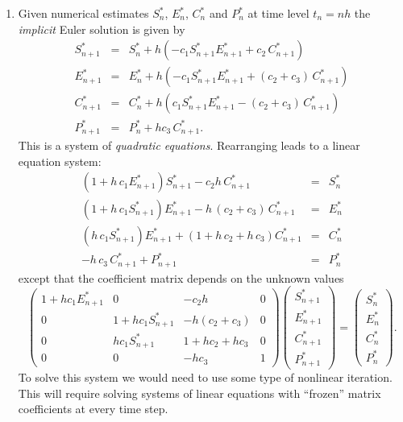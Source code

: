 \documentclass[11pt,a4paper]{article}
\begin{document}
\begin{enumerate}
{\begin{enumerate}
\item 
	Given  numerical estimates $S^*_{n}$,   $E^*_{n}$,  $C^*_{n}$ and  $P^*_{n}$
          at time level $t_n=nh$  the {\it implicit} Euler solution is given by 
	\begin{eqnarray*}
       S^*_{n+1}   &= &  S^*_{n} +h( -c_1 S^*_{n+1} E^*_{n+1}  +c_2\,C^*_{n+1})\\
       E^*_{n+1}  &= &   E^*_{n}  +h(  -c_1 S^*_{n+1} E^*_{n+1}  + (c_2 +c_3) \,C^*_{n+1})\\
      C^*_{n+1}  &= &   C^*_{n} +h( c_1 S^*_{n+1} E^*_{n+1}  - (c_2 +c_3) \,C^*_{n+1})\\
      P^*_{n+1}   &= &   P^*_{n}+h  c_3 \,C^*_{n+1}.
\end{eqnarray*}
This is a system of {\it quadratic equations}. 
Rearranging leads to a linear equation system:	
\begin{eqnarray*}
      (1+ h\, c_1 E^*_{n+1} )S^*_{n+1}   - c_2 h \,C^*_{n+1} &= &  S^*_{n} \\
     (1+ h\, c_1 S^*_{n+1} )  E^*_{n+1}  - h\, (c_2 +c_3) \,C^*_{n+1} &= &   E^*_{n}  \\
     (h \, c_1 S^*_{n+1}) E^*_{n+1} +  (1  +h\,  c_2 + h\,c_3) C^*_{n+1}  &= &   C^*_{n}   \\
      -h\,  c_3 \,C^*_{n+1} +   P^*_{n+1}  &= &   P^*_{n} \end{eqnarray*}
     except that  the coefficient  matrix depends on the unknown values
$$\left ( \begin{array}{cccc}
         1+ h  c_1 E^*_{n+1} & 0 &  - c_2 h  & 0 \\
        0 &  1+ h  c_1 S^*_{n+1}  & - h  (c_2 +c_3) & 0 \\
        0 & h  c_1 S^*_{n+1} & 1  +h  c_2 + h c_3 & 0 \\
         0 &  0 &   -h  c_3 &  1 \end{array} \right )
   \left ( \begin{array}{c}
         S^*_{n+1} \\ E^*_{n+1} \\ C^*_{n+1} \\   P^*_{n+1} 
            \end{array} \right) =
   \left ( \begin{array}{r}
        S^*_{n} \\ E^*_{n} \\ C^*_{n} \\   P^*_{n} 
            \end{array} \right) .$$
To solve this system we would need to use some type of nonlinear iteration. 
This will require solving systems of linear equations with ``frozen'' 
matrix coefficients  at every time step. 
	\end{enumerate}
 
}{}%





\end{enumerate}
\vfill\eject
\end{document}
